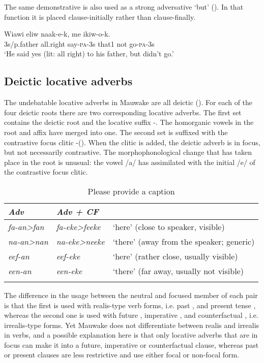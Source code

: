 The same demonstrative is also used as a strong adversative `but'  (). In that function it is placed clause-initially rather than clause-finally.

\ea%
\label{ex:3:x690}
\gll Wiawi eliw naak-e-k,  me ikiw-o-k. \\
3s/p.father all.right say-\textsc{pa}-3s that1 not go-\textsc{pa}-3s\\
\glt`He said yes (lit: all right) to his father, but didn't go.'
\z

\subsection{Deictic locative adverbs} \label{sec:3.6.3}
{}
The undebatable locative adverbs in Mauwake are all deictic (). For each of the four deictic roots there are two corresponding locative adverbs. The first set contains the deictic root and the locative suffix -. The homorganic vowels in the root and affix have merged into one. The second set is suffixed with the contrastive focus clitic -(). When the clitic is added, the deictic adverb is in focus, but not necessarily contrastive. The morphophonological change that has taken place in the root is unusual: the vowel /a/ has assimilated with the initial /e/ of the contrastive focus clitic. 

\begin{table}
\caption{Please provide a caption}
\label{} 
\begin{tabular}{>{\itshape}l>{\itshape}ll}
\mytoprule
Adv &Adv + CF&\\
\midrule
fa-an{\textgreater}fan &fa-eke{\textgreater}feeke &`here' (close to speaker, visible) \\
na-an{\textgreater}nan &na-eke{\textgreater}neeke &`there' (away from the speaker; generic)\\
eef-an &eef-eke &`here' (rather close, usually visible)\\
een-an &een-eke &`there' (far away, usually not visible)\\
\mybottomrule
\end{tabular}
\end{table}


The difference in the usage between the neutral and focused member of each pair is that the first is  used with realis-type verb forms, i.e. past ,  and present tense , whereas the second one is  used with future , imperative , and counterfactual , i.e. irrealis-type forms. Yet Mauwake does not differentiate between realis and irrealis in verbs, and a possible explanation here is that only locative adverbs that are in focus can make it into a future, imperative or counterfactual clause, whereas past or present clauses are less restrictive and use either focal or non-focal form. 

